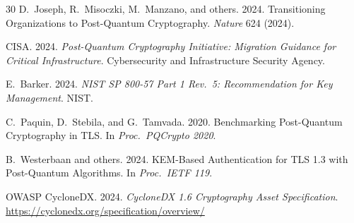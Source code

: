 \documentclass[sigconf,nonacm]{acmart}
\begin{document}
\begin{thebibliography}{30}
D.~Joseph, R.~Misoczki, M.~Manzano, and others. 2024. Transitioning
Organizations to Post-Quantum Cryptography. \textit{Nature} 624
(2024).

CISA. 2024. \textit{Post-Quantum Cryptography Initiative: Migration
Guidance for Critical Infrastructure}. Cybersecurity and Infrastructure
Security Agency.

E.~Barker. 2024. \textit{NIST SP 800-57 Part 1 Rev.\ 5: Recommendation
for Key Management}. NIST.

C.~Paquin, D.~Stebila, and G.~Tamvada. 2020. Benchmarking
Post-Quantum Cryptography in TLS. In \textit{Proc.\ PQCrypto 2020}.

B.~Westerbaan and others. 2024. KEM-Based Authentication for TLS 1.3
with Post-Quantum Algorithms. In \textit{Proc.\ IETF 119}.

OWASP CycloneDX. 2024. \textit{CycloneDX 1.6 Cryptography Asset
Specification}. \url{https://cyclonedx.org/specification/overview/}

\end{thebibliography}
\end{document}
